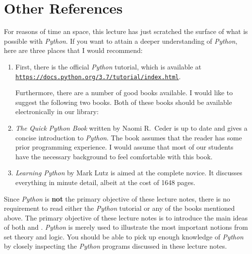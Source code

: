 \section{Other References}
For reasons of time an space, this lecture has just scratched the surface of what is possible with
\textsl{Python}.  If you want to attain a deeper understanding of \textsl{Python}, here are three places that 
I would recommend:
\begin{enumerate}
\item First, there is the official \textsl{Python} tutorial, which is available at
      \\[0.2cm]
      \hspace*{1.3cm}
      \href{https://docs.python.org/3.7/tutorial/index.html}{\texttt{https://docs.python.org/3.7/tutorial/index.html}}.

      Furthermore, there are a number of good books available.  I would like to suggest the following two
      books.  Both of these books should be available electronically in our library:
\item \emph{The Quick Python Book} written by Naomi R.~Ceder \cite{ceder:2018} is up to date and gives a
      concise introduction to \textsl{Python}.  The book assumes that the reader has some prior programming
      experience.  I would assume that most of our students have the necessary background to feel comfortable
      with this book.
\item \emph{Learning Python} by Mark Lutz \cite{lutz:2013} is aimed at the complete novice.  It discusses
      everything in minute detail, albeit at the cost of 1648 pages.
\end{enumerate}
Since \textsl{Python} is \textbf{not} the primary objective of these lecture notes, there is no requirement to read
either the \textsl{Python} tutorial or any of the books mentioned above.  The primary objective of these
lecture notes is to introduce the main ideas of both  and .
\textsl{Python} is merely used to illustrate the most important notions from set theory and logic.  You should
be able to pick up enough knowledge of \textsl{Python} by closely inspecting the \textsl{Python} programs
discussed in these lecture notes.  


